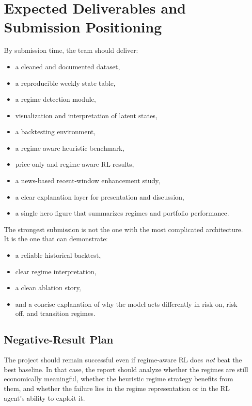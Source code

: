 \documentclass[11pt,a4paper]{article}
\begin{document}
\section{Expected Deliverables and Submission Positioning}

By submission time, the team should deliver:

\begin{itemize}[leftmargin=1.4em]
  \item a cleaned and documented dataset,
  \item a reproducible weekly state table,
  \item a regime detection module,
  \item visualization and interpretation of latent states,
  \item a backtesting environment,
  \item a regime-aware heuristic benchmark,
  \item price-only and regime-aware RL results,
  \item a news-based recent-window enhancement study,
  \item a clear explanation layer for presentation and discussion,
  \item a single hero figure that summarizes regimes and portfolio performance.
\end{itemize}

\begin{summarybox}[title=\textbf{Submission Positioning}]
The strongest submission is not the one with the most complicated architecture.
It is the one that can demonstrate:
\begin{itemize}[leftmargin=1.4em]
  \item a reliable historical backtest,
  \item clear regime interpretation,
  \item a clean ablation story,
  \item and a concise explanation of why the model acts differently in risk-on, risk-off, and transition regimes.
\end{itemize}
\end{summarybox}

\subsection{Negative-Result Plan}

The project should remain successful even if regime-aware RL does \emph{not} beat the best baseline.
In that case, the report should analyze whether the regimes are still economically meaningful, whether the heuristic regime strategy benefits from them, and whether the failure lies in the regime representation or in the RL agent's ability to exploit it.
\end{document}
